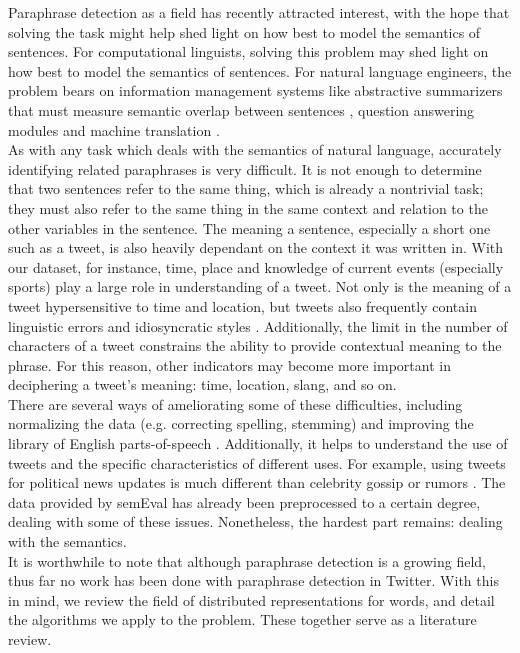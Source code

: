 \documentclass[conference]{IEEEtran}
\begin{document}
\indent Paraphrase detection as a field has recently attracted interest, with the hope that solving the task might help shed light on how best to model the semantics of sentences.  For computational linguists, solving this problem may shed light on how best to model the semantics of sentences. For natural language engineers, the problem bears on information management systems like abstractive summarizers that must measure semantic overlap between sentences \cite{barzilay}, question answering modules \cite{marsi} and machine translation \cite{burch} \cite{Das}. \\

\indent As with any task which deals with the semantics of natural language, accurately identifying related paraphrases is very difficult.  It is not enough to determine that two sentences refer to the same thing, which is already a nontrivial task; they must also refer to the same thing in the same context and relation to the other variables in the sentence.  The meaning a sentence, especially a short one such as a tweet, is also heavily dependant on the context it was written in.  With our dataset, for instance, time, place and knowledge of current events (especially sports) play a large role in understanding of a tweet. Not only is the meaning of a tweet hypersensitive to time and location, but tweets also frequently contain linguistic errors and idiosyncratic styles \cite{derczynski}. Additionally, the limit in the number of characters of a tweet constrains the ability to provide contextual meaning to the phrase. For this reason, other indicators may become more important in deciphering a tweet's meaning: time, location, slang, and so on.\\

\indent There are several ways of ameliorating some of these difficulties, including normalizing the data (e.g. correcting spelling, stemming) and improving the library of English parts-of-speech \cite{derczynski}. Additionally, it helps to understand the use of tweets and the specific characteristics of different uses. For example, using tweets for political news updates is much different than celebrity gossip or rumors \cite{OConnor}.  The data provided by semEval has already been preprocessed to a certain degree, dealing with some of these issues.  Nonetheless, the hardest part remains: dealing with the semantics.\\

\indent It is worthwhile to note that although paraphrase detection is a growing field, thus far no work has been done with paraphrase detection in Twitter.  With this in mind, we review the field of distributed representations for words, and detail the algorithms we apply to the problem.  These together serve as a literature review.
\end{document}

